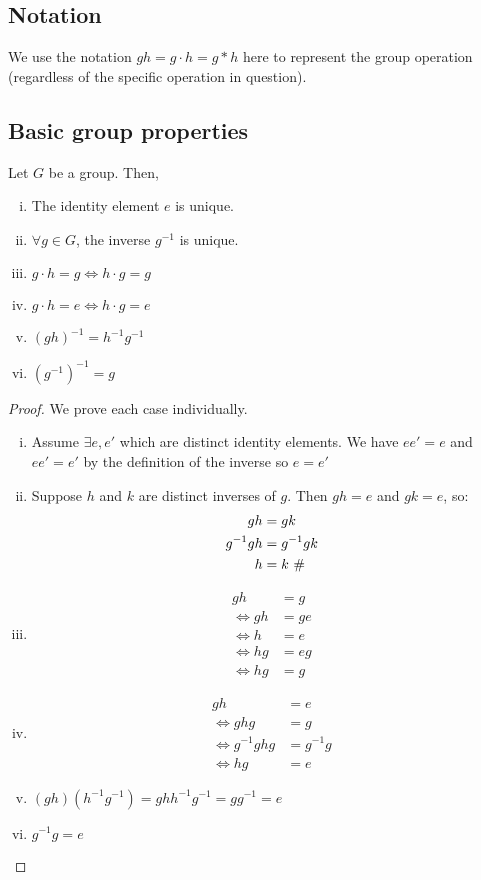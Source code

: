 \subsection{Notation}
We use the notation \(gh=g\cdot h = g \ast h\) here to represent the group operation (regardless of the specific operation in question).
\subsection{Basic group properties}
\begin{proposition}
	Let \(G\) be a group.
	Then,
	\begin{enumerate}[i.]
		\item The identity element \(e\) is unique.
		\item \(\forall g \in G\), the inverse \(g^{-1}\) is unique.
		\item \(g \cdot h = g \iff h \cdot g = g\)
		\item \(g \cdot h = e \iff h \cdot g = e\)
		\item \((gh)^{-1} = h^{-1} g^{-1}\)
		\item \((g^{-1})^{-1} = g\)
	\end{enumerate}
\end{proposition}
\begin{proof}
	We prove each case individually.
	\begin{enumerate}[i.]
		\item Assume \(\exists e, e'\) which are distinct identity elements.
		      We have \(e e' = e\) and \(e e' = e'\) by the definition of the inverse so \(e = e'\) \contradiction{}
		\item Suppose \(h\) and \(k\) are distinct inverses of \(g\).
		      Then \(gh = e\) and \(gk = e\), so:
		      \begin{align*}
			      gh        & = gk                       \\
			      g^{-1} gh & = g^{-1} gk                \\
			      h         & = k \text{ \(\#\)}
		      \end{align*}
		\item \begin{align*}
			      gh      & = g  \\
			      \iff gh & = ge \\
			      \iff h  & = e  \\
			      \iff hg & = eg \\
			      \iff hg & = g
		      \end{align*}
		\item \begin{align*}
			      gh              & = e       \\
			      \iff ghg        & = g       \\
			      \iff g^{-1} ghg & = g^{-1}g \\
			      \iff hg         & = e
		      \end{align*}
		\item \((gh) (h^{-1}g^{-1}) = g h h^{-1} g^{-1} = g g^{-1} = e\)
		\item \(g^{-1} g = e\)
	\end{enumerate}
\end{proof}

